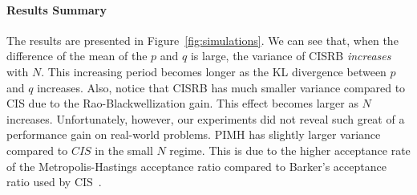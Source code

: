 \paragraph{Results Summary}
The results are presented in Figure~\ref{fig:simulations}.
We can see that, when the difference of the mean of the \(p\) and \(q\) is large, the variance of CISRB \textit{increases} with \(N\).
This increasing period becomes longer as the KL divergence between \(p\) and \(q\) increases.
Also, notice that CISRB has much smaller variance compared to CIS due to the Rao-Blackwellization gain.
This effect becomes larger as \(N\) increases.
Unfortunately, however, our experiments did not reveal such great of a performance gain on real-world problems.
PIMH has slightly larger variance compared to \(CIS\) in the small \(N\) regime.
This is due to the higher acceptance rate of the Metropolis-Hastings acceptance ratio compared to Barker's acceptance ratio used by CIS~\citep{peskun_optimum_1973, minh_understanding_2015}.


